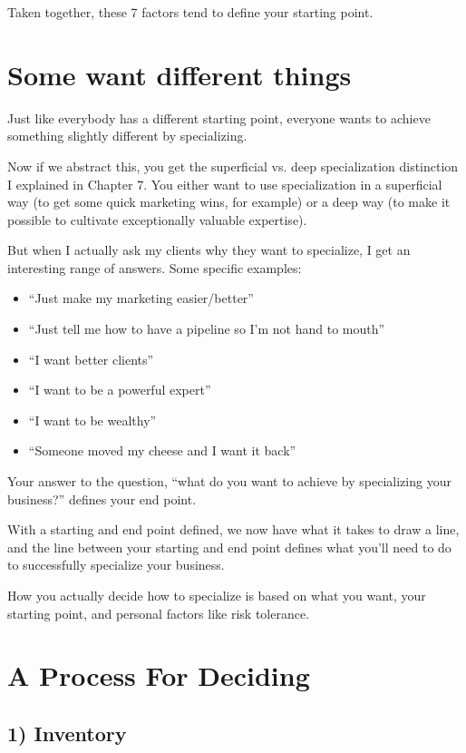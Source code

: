 Taken together, these 7 factors tend to define your starting point.

\section{Some want different things}

Just like everybody has a different starting point, everyone wants to achieve something slightly different by specializing.

Now if we abstract this, you get the superficial vs. deep specialization distinction I explained in Chapter 7. You either want to use specialization in a superficial way (to get some quick marketing wins, for example) or a deep way (to make it possible to cultivate exceptionally valuable expertise).

But when I actually ask my clients why they want to specialize, I get an interesting range of answers. Some specific examples:

\begin{itemize}
\item ``Just make my marketing easier/better''
\item ``Just tell me how to have a pipeline so I'm not hand to mouth''
\item ``I want better clients''
\item ``I want to be a powerful expert''
\item ``I want to be wealthy''
\item ``Someone moved my cheese and I want it back''
\end{itemize}

Your answer to the question, ``what do you want to achieve by specializing your business?'' defines your end point.

With a starting and end point defined, we now have what it takes to draw a line, and the line between your starting and end point defines what you'll need to do to successfully specialize your business.

How you actually decide how to specialize is based on what you want, your starting point, and personal factors like risk tolerance.

\section{A Process For Deciding}

\subsection{1) Inventory}

